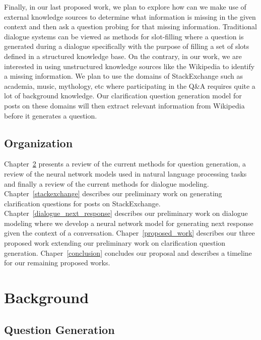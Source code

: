 \documentclass[11pt]{report}
\renewcommand\cite{\citep}	%
\begin{document}
\noindent
Finally, in our last proposed work, we plan to explore how can we make use of external knowledge sources to determine what information is missing in the given context and then ask a question probing for that missing information. Traditional dialogue systems \cite{lemon2006isu} can be viewed as methods for slot-filling where a question is generated during a dialogue specifically with the purpose of filling a set of slots defined in a structured knowledge base. On the contrary, in our work, we are interested in using unstructured knowledge sources like the Wikipedia to identify a missing information. We plan to use the domains of StackExchange such as academia, music, mythology, etc where participating in the Q\&A requires quite a lot of background knowledge. Our clarification question generation model for posts on these domains will then extract relevant information from Wikipedia before it generates a question. 

\section{Organization}

Chapter~\ref{background} presents a review of the current methods for question generation, a review of the neural network models used in natural language processing tasks and finally a review of the current methods for dialogue modeling. 
Chapter~\ref{stackexchange} describes our preliminary work on generating clarification questions for posts on StackExchange. Chapter~\ref{dialogue_next_response} describes our preliminary work on dialogue modeling where we develop a neural network model for generating next response given the context of a conversation. Chaper~\ref{proposed_work} describes our three proposed work extending our preliminary work on clarification question generation. Chaper~\ref{conclusion} concludes our proposal and describes a timeline for our remaining proposed works.

\newpage

\chapter{Background}\label{background}

\section{Question Generation}
\end{document}

